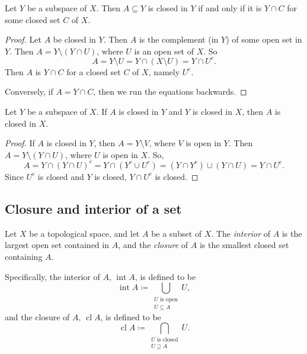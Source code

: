 \documentclass{article}
\DeclareMathOperator{\interior}{int}
\DeclareMathOperator{\closure}{cl}
\begin{document}
\begin{theorem}
    Let $Y$ be a subspace of $X$.
    Then $A \subseteq Y$ is closed in $Y$ if and only if it is $Y \cap C$ for some closed set $C$ of $X$.
\end{theorem}

\begin{proof}
    Let $A$ be closed in $Y$.
    Then $A$ is the complement (in $Y$) of some open set in $Y$.
    Then $A = Y \setminus (Y \cap U)$, where $U$ is an open set of $X$.
    So
    \[
        A = Y \setminus U = Y \cap (X \setminus U) = Y \cap U^c.
    \]
    Then $A$ is $Y \cap C$ for a closed set $C$ of $X$, namely $U^c$.

    Conversely, if $A = Y \cap C$, then we run the equations backwards.
\end{proof}

\begin{theorem}
    Let $Y$ be a subspace of $X$. If $A$ is closed in $Y$ and $Y$ is closed in $X$, then $A$ is closed in $X$.
\end{theorem}

\begin{proof}
    If $A$ is closed in $Y$, then $A = Y \setminus V$, where $V$ is open in $Y$.
    Then $A = Y \setminus (Y \cap U)$, where $U$ is open in $X$.
    So,
    \[
        A = Y \cap (Y \cap U)^c = Y \cap (Y^c \cup U^c) = (Y \cap Y^c) \cup (Y \cap U) = Y \cap U^c.
    \]
    Since $U^c$ is closed and $Y$ is closed, $Y \cap U^c$ is closed.
\end{proof}

\subsection{Closure and interior of a set}
\begin{definition}
    Let $X$ be a topological space, and let $A$ be a subset of $X$.
    The \textit{interior} of $A$ is the largest open set contained in $A$, and the \textit{closure} of $A$ is the smallest closed set containing $A$.

    Specifically, the interior of $A$, $\interior A$, is defined to be
    \[
        \interior A \coloneq \bigcup_{\substack{U\text{ is open} \\U \subseteq A}}U,
    \]
    and the closure of $A$, $\closure A$, is defined to be
    \[
        \closure A \coloneq \bigcap_{\substack{U\text{ is closed} \\U \supseteq A}}U.
    \]
\end{definition}
\end{document}
